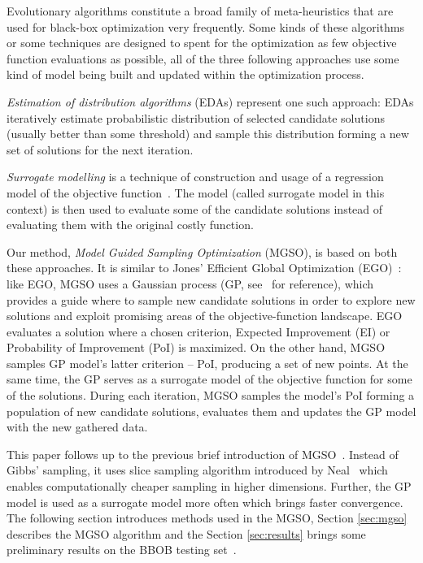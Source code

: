 \documentclass{itatnew}
\begin{document}
Evolutionary algorithms constitute a broad family of meta-heuristics that are used for black-box optimization very frequently. Some kinds of these algorithms or some techniques are designed to spent for the optimization as few objective function evaluations as possible, all of the three following approaches use some kind of model being built and updated within the optimization process.

\emph{Estimation of distribution algorithms} (EDAs) \cite{larranaga_estimation_2002} represent one such approach: EDAs iteratively estimate probabilistic distribution of selected candidate solutions (usually better than some threshold) and sample this distribution forming a new set of solutions for the next iteration. 

\emph{Surrogate modelling} is a technique of construction and usage of a regression model of the objective function~\cite{jin_comprehensive_2005}. The model (called surrogate model in this context) is then used to evaluate some of the candidate solutions instead of evaluating them with the original costly function.

Our method, \emph{Model Guided Sampling Optimization} (MGSO), is based on both these approaches. It is similar to Jones' Efficient Global Optimization (EGO)~\cite{jones_efficient_1998}: like EGO, MGSO uses a Gaussian process (GP, see~\cite{rasmussen_gaussian_2006} for reference), which provides a guide where to sample new candidate solutions in order to explore new solutions and exploit promising areas of the objective-function landscape. EGO evaluates a solution where a chosen criterion, Expected Improvement (EI) or Probability of Improvement (PoI) is maximized. On the other hand, MGSO samples GP model's latter criterion -- PoI, producing a set of new points. At the same time, the GP serves as a surrogate model of the objective function for some of the solutions. During each iteration, MGSO samples the model's PoI forming a population of new candidate solutions, evaluates them and updates the GP model with the new gathered data.

This paper follows up to the previous brief introduction of MGSO~\cite{bajer_model_2013}. Instead of Gibbs' sampling, it uses slice sampling algorithm introduced by Neal~\cite{neal_slice_2003} which enables computationally cheaper sampling in higher dimensions. Further, the GP model is used as a surrogate model more often which brings faster convergence. The following section introduces methods used in the MGSO, Section \ref{sec:mgso} describes the MGSO algorithm and the Section \ref{sec:results} brings some preliminary results on the BBOB testing set~\cite{hansen_real_2009}.
\end{document}
